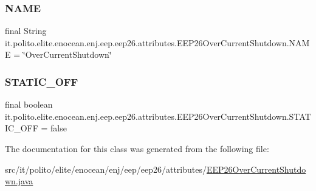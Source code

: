 \subsubsection{\texorpdfstring{N\+A\+ME}{NAME}}
{\footnotesize\ttfamily final String it.\+polito.\+elite.\+enocean.\+enj.\+eep.\+eep26.\+attributes.\+E\+E\+P26\+Over\+Current\+Shutdown.\+N\+A\+ME = \char`\"{}Over\+Current\+Shutdown\char`\"{}\hspace{0.3cm}{\ttfamily [static]}}

\hypertarget{classit_1_1polito_1_1elite_1_1enocean_1_1enj_1_1eep_1_1eep26_1_1attributes_1_1_e_e_p26_over_current_shutdown_a64a20898d0d1635e4da5448aed94488a}{}\label{classit_1_1polito_1_1elite_1_1enocean_1_1enj_1_1eep_1_1eep26_1_1attributes_1_1_e_e_p26_over_current_shutdown_a64a20898d0d1635e4da5448aed94488a} 
\subsubsection{\texorpdfstring{S\+T\+A\+T\+I\+C\+\_\+\+O\+FF}{STATIC\_OFF}}
{\footnotesize\ttfamily final boolean it.\+polito.\+elite.\+enocean.\+enj.\+eep.\+eep26.\+attributes.\+E\+E\+P26\+Over\+Current\+Shutdown.\+S\+T\+A\+T\+I\+C\+\_\+\+O\+FF = false\hspace{0.3cm}{\ttfamily [static]}}



The documentation for this class was generated from the following file\+:\begin{DoxyCompactItemize}
\item 
src/it/polito/elite/enocean/enj/eep/eep26/attributes/\hyperlink{_e_e_p26_over_current_shutdown_8java}{E\+E\+P26\+Over\+Current\+Shutdown.\+java}\end{DoxyCompactItemize}
